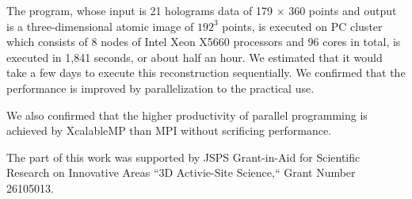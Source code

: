 \documentclass[graybox,vecphys]{svmult}
\begin{document}
The program, whose input is 21 holograms data of 179 {$\times$} 360
points and output is a three-dimensional atomic image of {$192^3$}
points, is executed on PC cluster which consists of 8 nodes of Intel
Xeon X5660 processors and 96 cores in total, is executed in
1,841 seconds, or about half an hour. We estimated that it would take a
few days to execute this reconstruction sequentially. We confirmed
that the performance is improved by parallelization to the practical
use.

We also confirmed that the higher productivity of parallel programming
is achieved by XcalableMP than MPI without scrificing performance.

\begin{acknowledgement}
  The part of this work was supported by JSPS Grant-in-Aid for Scientific
  Research on Innovative Areas ``3D Activie-Site Science,`` Grant Number
  26105013.
\end{acknowledgement}
  


\end{document}
